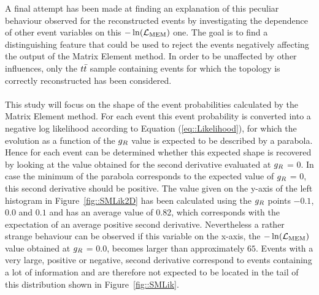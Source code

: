 A final attempt has been made at finding an explanation of this peculiar behaviour observed for the reconstructed events by investigating the dependence of other event variables on this $-\ln(\mathcal{L}_{\textrm{MEM}})$ one.
The goal is to find a distinguishing feature that could be used to reject the events negatively affecting the output of the Matrix Element method.
In order to be unaffected by other influences, only the $t\bar{t}$ sample containing events for which the topology is correctly reconstructed has been considered.
\\
\\
This study will focus on the shape of the event probabilities calculated by the Matrix Element method. For each event this event probability is converted into a negative log likelihood according to Equation (\ref{eq::Likelihood}), for which the evolution as a function of the $g_{R}$ value is expected to be described by a parabola.
\\
Hence for each event can be determined whether this expected shape is recovered by looking at the value obtained for the second derivative evaluated at $g_{R}$ = $0$. In case the minimum of the parabola corresponds to the expected value of $g_{R}$ = 0, this second derivative should be positive. 
The value given on the y-axis of the left histogram in Figure~\ref{fig::SMLik2D} has been calculated using the $g_{R}$ points $-0.1$, $0.0$ and $0.1$ and has an average value of 0.82, which corresponds with the expectation of an average positive second derivative. Nevertheless a rather strange behaviour can be observed if this variable on the x-axis, the $-\ln(\mathcal{L}_{\textrm{MEM}})$ value obtained at $g_{R}$ = 0.0, becomes larger than approximately $65$. Events with a very large, positive or negative, second derivative correspond to events containing a lot of information and are therefore not expected to be located in the tail of this distribution shown in Figure~\ref{fig::SMLik}.
